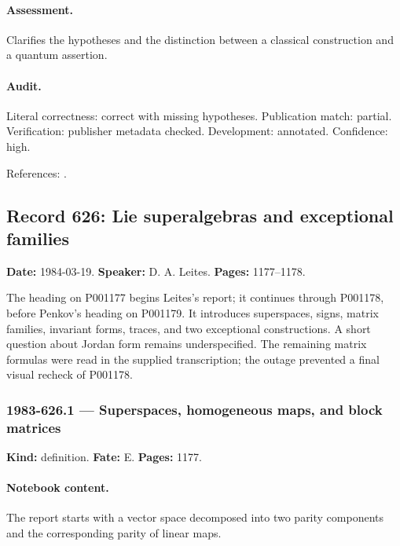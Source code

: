 \paragraph{Assessment.} Clarifies the hypotheses and the distinction between a classical construction and a quantum assertion.

\paragraph{Audit.} Literal correctness: correct with missing hypotheses. Publication match: partial. Verification: publisher metadata checked. Development: annotated. Confidence: high.

\noindent References: \citep{batalinvilkovisky1983dependent,fradkinvilkovisky1975constraints}.\par

\subsection{Record 626: Lie superalgebras and exceptional families}

\label{talk:626}

\noindent\textbf{Date:} 1984-03-19. \textbf{Speaker:} D. A. Leites. \textbf{Pages:} 1177--1178.\par

The heading on P001177 begins Leites’s report; it continues through P001178, before Penkov’s heading on P001179. It introduces superspaces, signs, matrix families, invariant forms, traces, and two exceptional constructions. A short question about Jordan form remains underspecified. The remaining matrix formulas were read in the supplied transcription; the outage prevented a final visual recheck of P001178.

\subsubsection{1983-626.1 --- Superspaces, homogeneous maps, and block matrices}

\label{item:1983-626.1}

\noindent\textbf{Kind:} definition. \textbf{Fate:} E. \textbf{Pages:} 1177.\par

\paragraph{Notebook content.} The report starts with a vector space decomposed into two parity components and the corresponding parity of linear maps.

